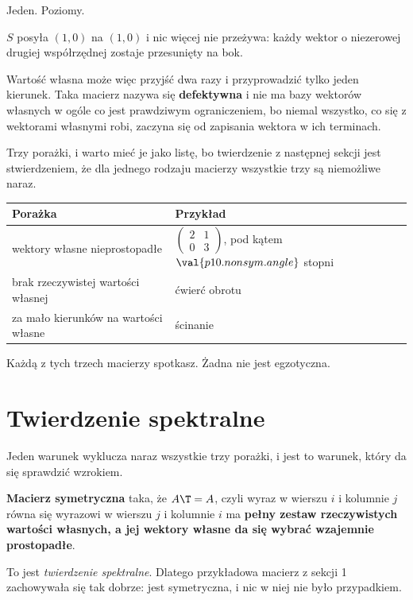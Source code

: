 \begin{fr}
\begin{ansblock}
Jeden. Poziomy.
\end{ansblock}

$S$ posyła $(1, 0)$ na $(1, 0)$ i nic więcej nie przeżywa: każdy wektor o
niezerowej drugiej współrzędnej zostaje przesunięty na bok.

Wartość własna może więc przyjść dwa razy i przyprowadzić tylko jeden kierunek.
Taka macierz nazywa się \textbf{defektywna} i nie ma bazy wektorów własnych w
ogóle \dash{} co jest prawdziwym ograniczeniem, bo niemal wszystko, co się z
wektorami własnymi robi, zaczyna się od zapisania wektora w ich terminach.
\end{fr}

\begin{fr}
Trzy porażki, i warto mieć je jako listę, bo twierdzenie z następnej sekcji jest
stwierdzeniem, że dla jednego rodzaju macierzy wszystkie trzy są niemożliwe
naraz.

\begin{center}
\begin{tabularx}{\linewidth}{@{}lX@{}}
\toprule
\textbf{Porażka} & \textbf{Przykład} \\
\midrule
wektory własne nieprostopadłe & $\begin{pmatrix} 2 & 1 \\ 0 & 3 \end{pmatrix}$,
  pod kątem $\val{p10.nonsym.angle}$ stopni \\
brak rzeczywistej wartości własnej & ćwierć obrotu \\
za mało kierunków na wartości własne & ścinanie \\
\bottomrule
\end{tabularx}
\end{center}

Każdą z tych trzech macierzy spotkasz. Żadna nie jest egzotyczna.
\end{fr}

\section{Twierdzenie spektralne}
\label{sec:P10-spectral}

\begin{fr}
Jeden warunek wyklucza naraz wszystkie trzy porażki, i jest to warunek, który
da się sprawdzić wzrokiem.

\textbf{Macierz symetryczna} \dash{} taka, że $A\T = A$, czyli wyraz w wierszu
$i$ i kolumnie $j$ równa się wyrazowi w wierszu $j$ i kolumnie $i$ \dash{} ma
\textbf{pełny zestaw rzeczywistych wartości własnych, a jej wektory własne da
się wybrać wzajemnie prostopadłe}.

To jest \emph{twierdzenie spektralne}. Dlatego przykładowa macierz z sekcji 1
zachowywała się tak dobrze: jest symetryczna, i nic w niej nie było
przypadkiem.
\end{fr}

